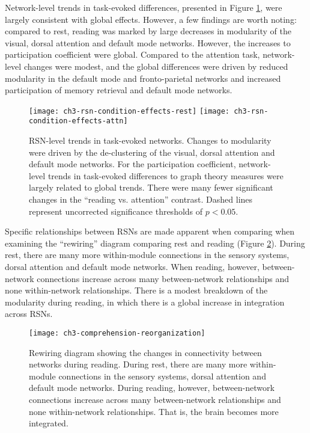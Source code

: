 Network-level trends in task-evoked differences, presented in Figure \ref{fig:ch3-rsn-condition-effects}, were largely consistent with global effects. However, a few findings are worth noting: compared to rest, reading was marked by large decreases in modularity of the visual, dorsal attention and default mode networks. However, the increases to participation coefficient were global. Compared to the attention task, network-level changes were modest, and the global differences were driven by reduced modularity in the default mode and fronto-parietal networks and increased participation of memory retrieval and default mode networks.

\begin{figure}[t]
	\centering
	\texttt{[image: ch3-rsn-condition-effects-rest]}
	\texttt{[image: ch3-rsn-condition-effects-attn]}
    \caption[RSN-level trends in task-evoked networks.]{RSN-level trends in task-evoked networks. Changes to modularity were driven by the de-clustering of the visual, dorsal attention and default mode networks. For the participation coefficient, network-level trends in task-evoked differences to graph theory measures were largely related to global trends. There were many fewer significant changes in the ``reading vs. attention'' contrast. Dashed lines represent uncorrected significance thresholds of $p < 0.05$.}
	\label{fig:ch3-rsn-condition-effects}
\end{figure}

Specific relationships between RSNs are made apparent when comparing when examining the ``rewiring'' diagram comparing rest and reading (Figure \ref{fig:ch3-comprehension-reorganization}). During rest, there are many more within-module connections in the sensory systems, dorsal attention and default mode networks. When reading, however, between-network connections increase across many between-network relationships and none within-network relationships. There is a modest breakdown of the modularity during reading, in which there is a global increase in integration across RSNs.

\begin{figure}[t]
	\centering
	\texttt{[image: ch3-comprehension-reorganization]}
    \caption[Rewiring of RSNs during reading.]{Rewiring diagram showing the changes in connectivity between networks during reading. During rest, there are many more within-module connections in the sensory systems, dorsal attention and default mode networks. During reading, however, between-network connections increase across many between-network relationships and none within-network relationships. That is, the brain becomes more integrated.}
	\label{fig:ch3-comprehension-reorganization}
\end{figure}

